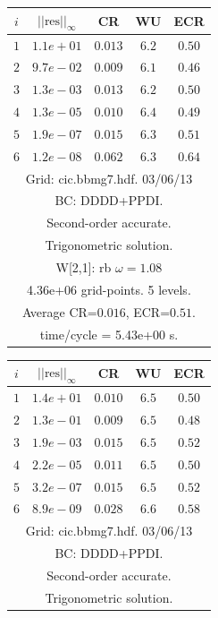 \begin{table}[hbt]
\begin{center}
{\begin{tabular}{|c|c|c|c|c|}
 $i$   & $\vert\vert\mbox{res}\vert\vert_\infty$  &  CR     &  WU    & ECR  \\   \hline 
 $ 1$  & $ 1.1e+01$ & $0.013$ & $ 6.2$ & $0.50$ \\ 
 $ 2$  & $ 9.7e-02$ & $0.009$ & $ 6.1$ & $0.46$ \\ 
 $ 3$  & $ 1.3e-03$ & $0.013$ & $ 6.2$ & $0.50$ \\ 
 $ 4$  & $ 1.3e-05$ & $0.010$ & $ 6.4$ & $0.49$ \\ 
 $ 5$  & $ 1.9e-07$ & $0.015$ & $ 6.3$ & $0.51$ \\ 
 $ 6$  & $ 1.2e-08$ & $0.062$ & $ 6.3$ & $0.64$ \\ 
\hline 
\multicolumn{5}{|c|}{Grid: cic.bbmg7.hdf. 03/06/13}  \\
\multicolumn{5}{|c|}{BC: DDDD+PPDI.}  \\
\multicolumn{5}{|c|}{Second-order accurate.}  \\
\multicolumn{5}{|c|}{Trigonometric solution.}  \\
\multicolumn{5}{|c|}{W[2,1]: rb $\omega=1.08$}  \\
\multicolumn{5}{|c|}{4.36e+06 grid-points. 5 levels.}  \\
\multicolumn{5}{|c|}{Average CR=$0.016$, ECR=$0.51$.}  \\
\multicolumn{5}{|c|}{time/cycle = 5.43e+00 s.}  \\
\hline 
\end{tabular}
\begin{tabular}{|c|c|c|c|c|} \hline 
 $i$   & $\vert\vert\mbox{res}\vert\vert_\infty$  &  CR     &  WU    & ECR  \\   \hline 
 $ 1$  & $ 1.4e+01$ & $0.010$ & $ 6.5$ & $0.50$ \\ 
 $ 2$  & $ 1.3e-01$ & $0.009$ & $ 6.5$ & $0.48$ \\ 
 $ 3$  & $ 1.9e-03$ & $0.015$ & $ 6.5$ & $0.52$ \\ 
 $ 4$  & $ 2.2e-05$ & $0.011$ & $ 6.5$ & $0.50$ \\ 
 $ 5$  & $ 3.2e-07$ & $0.015$ & $ 6.5$ & $0.52$ \\ 
 $ 6$  & $ 8.9e-09$ & $0.028$ & $ 6.6$ & $0.58$ \\ 
\hline 
\multicolumn{5}{|c|}{Grid: cic.bbmg7.hdf. 03/06/13}  \\
\multicolumn{5}{|c|}{BC: DDDD+PPDI.}  \\
\multicolumn{5}{|c|}{Second-order accurate.}  \\
\multicolumn{5}{|c|}{Trigonometric solution.}  \\

\end{tabular}}
\end{center}
\end{table}
